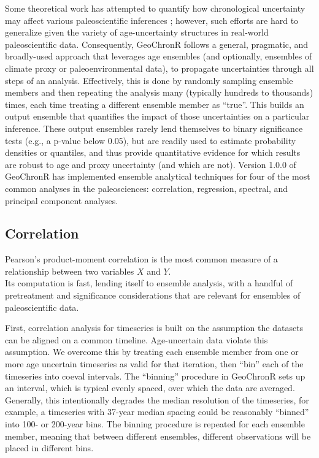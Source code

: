 \documentclass[gchron, manuscript]{copernicus}
\begin{document}
Some theoretical work has attempted to quantify how chronological uncertainty may affect various paleoscientific inferences \citep[e.g.][]{HuybersWunsch2004}; however, such efforts are hard to generalize given the variety of age-uncertainty structures in real-world paleoscientific data.
Consequently, GeoChronR follows a general, pragmatic, and broadly-used approach that leverages age ensembles (and optionally, ensembles of climate proxy or paleoenvironmental data), to propagate uncertainties through all steps of an analysis.
Effectively, this is done by randomly sampling ensemble members and then repeating the analysis many (typically hundreds to thousands) times, each time treating a different ensemble member as ``true''.
This builds an output ensemble that quantifies the impact of those uncertainties on a particular inference.
These output ensembles rarely lend themselves to binary significance tests (e.g., a p-value below 0.05), but are readily used to estimate probability densities or quantiles, and thus provide quantitative evidence for which results are robust to age and proxy uncertainty (and which are not).
Version 1.0.0 of GeoChronR has implemented ensemble analytical techniques for four of the most common analyses in the paleosciences: correlation, regression, spectral, and principal component analyses.

\hypertarget{sec:correlation}{%
\subsection{Correlation}\label{sec:correlation}}

Pearson's product-moment correlation is the most common measure of a relationship between two variables \(X\) and \(Y\).\\
Its computation is fast, lending itself to ensemble analysis, with a handful of pretreatment and significance considerations that are relevant for ensembles of paleoscientific data.

First, correlation analysis for timeseries is built on the assumption the datasets can be aligned on a common timeline.
Age-uncertain data violate this assumption.
We overcome this by treating each ensemble member from one or more age uncertain timeseries as valid for that iteration, then ``bin'' each of the timeseries into coeval intervals.
The ``binning'' procedure in GeoChronR sets up an interval, which is typical evenly spaced, over which the data are averaged. Generally, this intentionally degrades the median resolution of the timeseries, for example, a timeseries with 37-year median spacing could be reasonably ``binned'' into 100- or 200-year bins.
The binning procedure is repeated for each ensemble member, meaning that between different ensembles, different observations will be placed in different bins.
\end{document}
